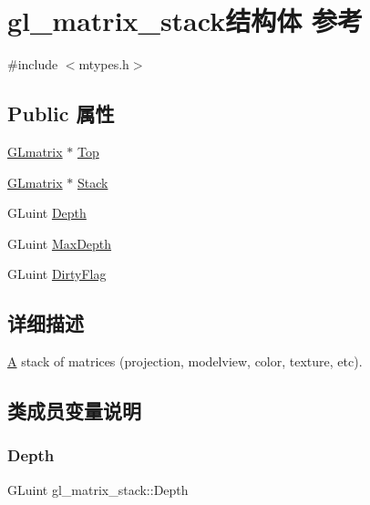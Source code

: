 \hypertarget{structgl__matrix__stack}{}\section{gl\+\_\+matrix\+\_\+stack结构体 参考}
\label{structgl__matrix__stack}


{\ttfamily \#include $<$mtypes.\+h$>$}

\subsection*{Public 属性}
\begin{DoxyCompactItemize}
\item 
\hyperlink{struct_g_lmatrix}{G\+Lmatrix} $\ast$ \hyperlink{structgl__matrix__stack_ac9d0fa6c388523904d19ee58e6642350}{Top}
\item 
\hyperlink{struct_g_lmatrix}{G\+Lmatrix} $\ast$ \hyperlink{structgl__matrix__stack_a7c61fe71555587df2ff75812c96fd9a9}{Stack}
\item 
G\+Luint \hyperlink{structgl__matrix__stack_af1a73779e101727cddf0b238b8a00ab3}{Depth}
\item 
G\+Luint \hyperlink{structgl__matrix__stack_a2da7b61ccb31e75487b736e3bece89e9}{Max\+Depth}
\item 
G\+Luint \hyperlink{structgl__matrix__stack_a9e46af3c290a4695a92ddc22348f6dc0}{Dirty\+Flag}
\end{DoxyCompactItemize}


\subsection{详细描述}
\hyperlink{struct_a}{A} stack of matrices (projection, modelview, color, texture, etc). 

\subsection{类成员变量说明}
\mbox{\label{structgl__matrix__stack_af1a73779e101727cddf0b238b8a00ab3}} 
\subsubsection{\texorpdfstring{Depth}{Depth}}
{\footnotesize\ttfamily G\+Luint gl\+\_\+matrix\+\_\+stack\+::\+Depth}

